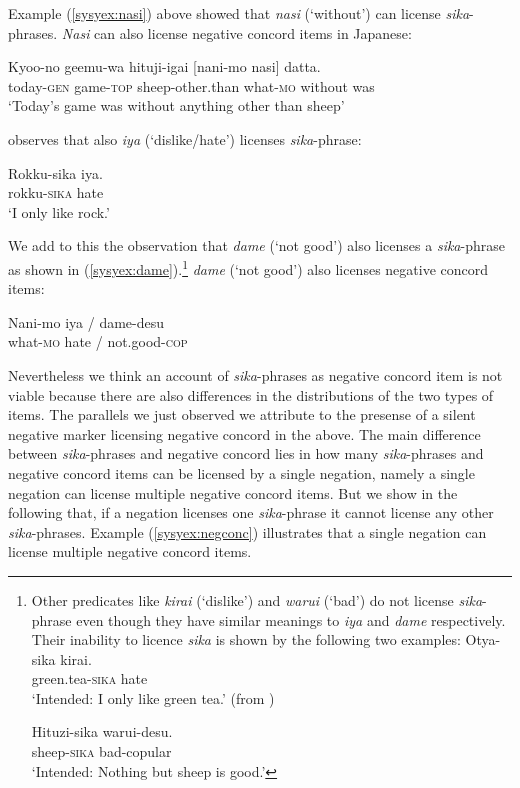 \documentclass[output=paper,colorlinks,citecolor=brown,
]{langscibook}
\def\refp#1{(\ref{sy#1})}
\def\M#1{\textsc{#1}}
\begin{document}
Example \refp{syex:nasi} above showed that \emph{nasi} (`without') can license \emph{sika}-phrases.  \emph{Nasi} can also license negative concord items in Japanese:

\ea \gll Kyoo-no geemu-wa hituji-igai [nani-mo nasi] datta.\\
today-\M{gen} game-\M{top} sheep-other.than what-\textsc{mo} without was\\
\glt `Today's game was without anything other than sheep'\z


\cite{hasegawa11a} observes that also \emph{iya} (`dislike/hate')  licenses \emph{sika}-phrase:

\ea \gll Rokku-sika iya.\\
rokku-\M{sika} hate \\
\glt `I only like rock.'\z

We add to this the observation that  \emph{dame} (`not good') also licenses a \emph{sika}-phrase as shown in \refp{syex:dame}.\footnote{Other predicates like \emph{kirai} (`dislike') and \emph{warui} (`bad') do not license \emph{sika}-phrase even though they have similar meanings to \emph{iya} and \emph{dame} respectively.
Their inability to licence \emph{sika} is shown by the following two examples:
\ea \gll *Otya-sika kirai.\\
green.tea-\M{sika} hate \\
\glt `Intended: I only like green tea.' (from \citealt{hasegawa11a})\z

\ea \gll *Hituzi-sika warui-desu.\\
sheep-\M{sika} bad-copular\\
\glt `Intended: Nothing but sheep is good.'\z
}
\emph{dame} (`not good') also licenses negative concord items:

\ea \label{syex:dame}
   \gll Nani-mo iya / dame-desu\\
   what-\M{mo} hate / not.good-\M{cop}\\\z

Nevertheless we think an account of \emph{sika}-phrases as negative concord item is not viable because there are also differences in the distributions of the two types of items.  
The parallels we just observed we attribute to the presense of a silent negative marker licensing negative concord in the above.
The main difference between \emph{sika}-phrases and negative concord lies in how many \emph{sika}-phrases and  negative concord items can be licensed by a single negation, namely a single negation can license multiple negative concord items.  
But we show in the following that, if a negation licenses one \emph{sika}-phrase it cannot license any other \emph{sika}-phrases.  
Example \refp{syex:negconc} illustrates that a single negation can license multiple negative concord items.
\end{document}
